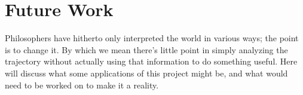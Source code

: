 \section{Future Work}

Philosophers have hitherto only interpreted the world in various ways; the point is to change it. By which we mean there's little point in simply analyzing the trajectory without actually using that information to do something useful. Here will discuss what some applications of this project might be, and what would need to be worked on to make it a reality.

